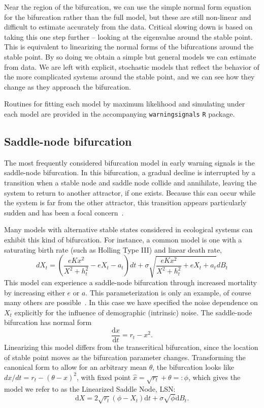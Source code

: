\documentclass[authoryear, preprint,review,12pt]{elsarticle}
\newcommand{\ud}{\mathrm{d}}
\begin{document}
Near the region of the bifurcation,
we can use the simple normal form equation for the bifurcation rather than the full model,
but these are still non-linear and difficult to estimate accurately from the data.
Critical slowing down is based on taking this one step further -- looking at the eigenvalue around the stable point.
This is equivalent to linearizing the normal forms of the bifurcations around the stable point.
By so doing we obtain a simple but general models we can estimate from data.
We are left with explicit, stochastic models that reflect the behavior of the more complicated systems around the stable point,
and we can see how they change as they approach the bifurcation.  

Routines for fitting each model by maximum likelihood and simulating under each model are provided in the accompanying \texttt{warningsignals} \texttt{R} package.   

\subsection{Saddle-node bifurcation}
The most frequently considered bifurcation model in early warning signals is the saddle-node bifurcation.  
In this bifurcation, a gradual decline is interrupted by a transition when a stable node and saddle node collide and annihilate, 
leaving the system to return to another attractor, if one exists.  
Because this can occur while the system is far from the other attractor, 
this transition appears particularly sudden and has been a focal concern~\citep{Scheffer2001, Scheffer2009}.  

Many models with alternative stable states considered in ecological systems can exhibit this kind of bifurcation.
For instance, a common model is one with a saturating birth rate (such as Holling Type III) and linear death rate, 
\begin{equation}
dX_t = \left( \frac{e K x^2}{X^2 + h_t^2} - e X_t - a_t\right) dt + \sigma \sqrt{ \frac{e K x^2}{X^2 + h_t^2} + e X_t + a_t} dB_t \label{ass}
\end{equation}
This model can experience a saddle-node bifurcation through increased mortality by increasing either $e$ or $a$. 
This parameterization is only an example, of course many others are possible~\citep{Scheffer2009a, Scheffer2001, Strogatz2001a, Guckenheimer1983}.  
In this case we have specified the noise dependence on $X_t$ explicitly for the influence of demographic (intrinsic) noise.
The saddle-node bifurcation has normal form
\begin{equation}
\frac{\ud x}{\ud t} = r_t- x^2.
\label{saddle-node}
\end{equation}
Linearizing this model differs from the transcritical bifurcation,
since the location of stable point moves as the bifurcation parameter changes.
Transforming the canonical form to allow for an arbitrary mean $\theta$,
the bifurcation looks like $ dx/dt = r_t- (\theta-x)^2 $, with fixed point $\hat x = \sqrt{r_t} +\theta =: \phi$,
which gives the model we refer to as the Linearized Saddle Node, LSN: 
\begin{equation}
\ud X = 2\sqrt{ r_t } (\phi - X_t)\ud t + \sigma\sqrt{\phi } \ud B_t. \label{LSN}
\end{equation}
\end{document}
